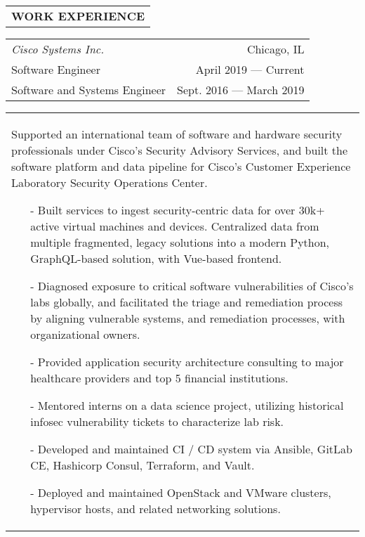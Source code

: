 \begin{tabularx}{\textwidth}{L}
    \textbf{WORK EXPERIENCE}
\end{tabularx}

\begin{tabularx}{\textwidth}{L R}
    \normalsize\textit{Cisco Systems Inc.} & Chicago, IL \\
    \hspace{10pt}Software Engineer & April 2019 --- Current \\
    \hspace{10pt}Software and Systems Engineer & Sept. 2016 --- March 2019 \\
\end{tabularx}
\begin{tabularx}{\textwidth}{X}
    \vspace{1pt}
    Supported an international team of software and hardware security professionals under Cisco's Security Advisory Services, and built the software platform and data pipeline for Cisco's Customer Experience Laboratory Security Operations Center.
    \begin{itemize}
        \itemsep{}
        \item[-] Built services to ingest security-centric data for over 30k+ active virtual machines and devices. Centralized data from multiple fragmented, legacy solutions into a modern Python, GraphQL-based solution, with Vue-based frontend.
        \item[-] Diagnosed exposure to critical software vulnerabilities of Cisco's labs globally, and facilitated the triage and remediation process by aligning vulnerable systems, and remediation processes, with organizational owners.
        \item[-] Provided application security architecture consulting to major healthcare providers and top 5 financial institutions.
        \item[-] Mentored interns on a data science project, utilizing historical infosec vulnerability tickets to characterize lab risk.
        \item[-] Developed and maintained CI / CD system via Ansible, GitLab CE, Hashicorp Consul, Terraform, and Vault.
        \item[-] Deployed and maintained OpenStack and VMware clusters, hypervisor hosts, and related networking solutions.
    \end{itemize}
\end{tabularx}

